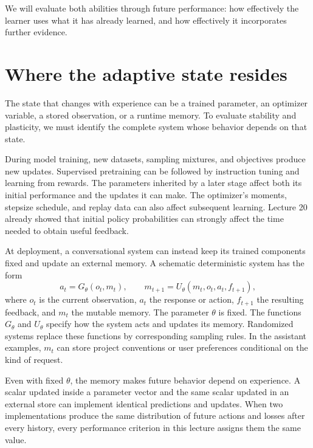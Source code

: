 \documentclass[11pt,twoside]{article}
\theoremstyle{definition}
\theoremstyle{remark}
\begin{document}
We will evaluate both abilities through future performance: how effectively
the learner uses what it has already learned, and how effectively it
incorporates further evidence.

\section{Where the adaptive state resides}
\label{sec:system}

The state that changes with experience can be a trained parameter, an
optimizer variable, a stored observation, or a runtime memory. To evaluate
stability and plasticity, we must identify the complete system whose behavior
depends on that state.

During model training, new datasets, sampling mixtures, and objectives
produce new updates. Supervised pretraining can be followed by
instruction tuning and learning from rewards. The parameters inherited by
a later stage affect both its initial performance and the updates it can
make. The optimizer's moments, stepsize schedule, and replay data can also
affect subsequent learning. Lecture 20 already showed that initial policy
probabilities can strongly affect the time needed to obtain useful feedback.

At deployment, a conversational system can instead keep its trained
components fixed and update an external memory. A schematic deterministic
system has the form
\begin{equation}
 a_t=G_\theta(o_t,m_t),\qquad
 m_{t+1}=U_\theta(m_t,o_t,a_t,f_{t+1}),
 \label{eq:runtime}
\end{equation}
where $o_t$ is the current observation, $a_t$ the response or action,
$f_{t+1}$ the resulting feedback, and $m_t$ the mutable memory.
The parameter $\theta$ is fixed. The functions $G_\theta$ and $U_\theta$
specify how the system acts and updates its memory. Randomized systems
replace these functions by corresponding sampling rules.
In the assistant examples, $m_t$ can store project conventions or user
preferences conditional on the kind of request.

Even with fixed $\theta$, the memory makes future behavior depend on
experience. A scalar updated inside a parameter vector and the same scalar
updated in an external store can implement identical predictions and updates.
When two implementations produce the same distribution of future actions
and losses after every history, every performance criterion in this lecture
assigns them the same value.
\end{document}
